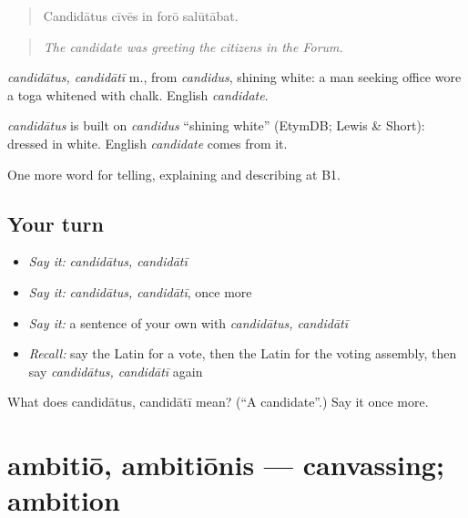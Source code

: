 \begin{quote}
Candidātus cīvēs in forō salūtābat.
\end{quote}

\begin{quote}
\emph{The candidate was greeting the citizens in the Forum.}
\end{quote}

\emph{candidātus, candidātī} m., from \emph{candidus}, shining white: a man seeking office wore a toga whitened with chalk. English \emph{candidate}.

\begin{cousinweb}
\emph{candidātus} is built on \emph{candidus} \textquotedblleft{}shining white\textquotedblright{} (EtymDB; Lewis \& Short): dressed in white. English \emph{candidate} comes from it.
\end{cousinweb}

\begin{grammarlens}[title={What you've built}]
One more word for telling, explaining and describing at B1.
\end{grammarlens}

\subsection*{Your turn}
\begin{itemize}
\raggedright
  \item \emph{Say it:} \emph{candidātus, candidātī}
  \item \emph{Say it:} \emph{candidātus, candidātī}, once more
  \item \emph{Say it:} a sentence of your own with \emph{candidātus, candidātī}
  \item \emph{Recall:} say the Latin for a vote, then the Latin for the voting assembly, then say \emph{candidātus, candidātī} again
\end{itemize}

\begin{tcolorbox}[breakable,colback=teal!4,colframe=teal!35!black,title={Before you move on}]
What does candidātus, candidātī mean? (\textquotedblleft{}A candidate\textquotedblright{}.) Say it once more.
\end{tcolorbox}
\section[ambitiō, ambitiōnis]{ambitiō, ambitiōnis — canvassing; ambition}

\label{lesson:LA-C384-ambitio}



